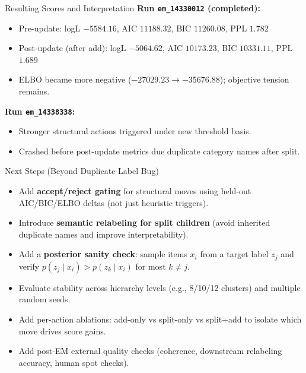 \documentclass{beamer}
\begin{document}
\begin{frame}{Resulting Scores and Interpretation}
\small
\textbf{Run \texttt{em\_14330012} (completed):}
\begin{itemize}
  \item Pre-update: logL \(-5584.16\), AIC \(11188.32\), BIC \(11260.08\), PPL \(1.782\)
  \item Post-update (after add): logL \(-5064.62\), AIC \(10173.23\), BIC \(10331.11\), PPL \(1.689\)
  \item ELBO became more negative (\(-27029.23 \rightarrow -35676.88\)); objective tension remains.
\end{itemize}

\textbf{Run \texttt{em\_14338338}:}
\begin{itemize}
  \item Stronger structural actions triggered under new threshold basis.
  \item Crashed before post-update metrics due duplicate category names after split.
\end{itemize}
\end{frame}

\begin{frame}{Next Steps (Beyond Duplicate-Label Bug)}
\small
\begin{itemize}
  \item Add \textbf{accept/reject gating} for structural moves using held-out AIC/BIC/ELBO deltas (not just heuristic triggers).
  \item Introduce \textbf{semantic relabeling for split children} (avoid inherited duplicate names and improve interpretability).
  \item Add a \textbf{posterior sanity check}: sample items \(x_i\) from a target label \(z_j\) and verify
  \(p(z_j \mid x_i) > p(z_k \mid x_i)\) for most \(k \neq j\).
  \item Evaluate stability across hierarchy levels (e.g., 8/10/12 clusters) and multiple random seeds.
  \item Add per-action ablations: add-only vs split-only vs split+add to isolate which move drives score gains.
  \item Add post-EM external quality checks (coherence, downstream relabeling accuracy, human spot checks).
\end{itemize}
\end{frame}
\end{document}
